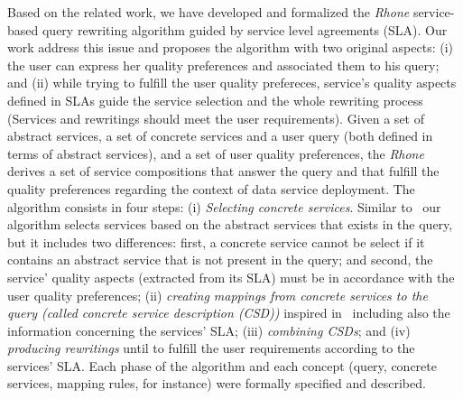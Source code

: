 \documentclass[11pt,a4paper,oneside]{report}
\begin{document}

Based on the related work, we have developed and formalized the \textit{Rhone} service-based query rewriting algorithm guided by service level agreements (SLA). Our work address this issue and proposes the algorithm with two original aspects: (i) the user can express her quality preferences and associated them to his query; and (ii) while trying to fulfill the user quality prefereces, service’s quality aspects defined in SLAs guide the service selection and the whole rewriting process (Services and rewritings should meet the user requirements). Given a set of abstract services, a set of concrete services and a user query (both defined in terms of abstract services), and a set of user quality preferences, the \textit{Rhone} derives a set of service compositions that answer the query and that fulfill the quality preferences regarding the context of data service deployment. The algorithm consists in four steps: (i) \textit{Selecting concrete services}. Similar to~\cite{Levy:1996,Pottinger:2001} our algorithm selects services based on the abstract services that exists in the query, but it includes two differences: first, a concrete service cannot be select if it contains an abstract service that is not present in the query; and second, the service' quality aspects (extracted from its SLA) must be in accordance with the user quality preferences; (ii) \textit{creating mappings from concrete services to the query (called concrete service description (CSD))} inspired in~\cite{Pottinger:2001} including also the information concerning the services' SLA; (iii) \textit{combining CSDs}; and (iv) \textit{producing rewritings} until to fulfill the user requirements according to the services' SLA. Each phase of the algorithm and each concept (query, concrete services, mapping rules, for instance) were formally specified and described.
\end{document}
